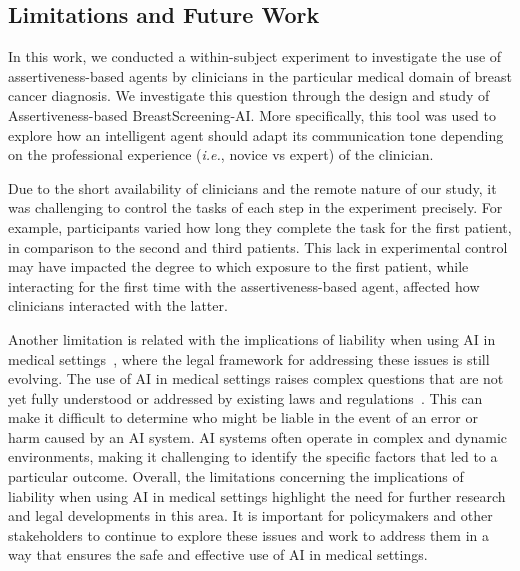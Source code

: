 

\subsection{Limitations and Future Work}
\label{sec:chap006007002}

In this work, we conducted a within-subject experiment to investigate the use of assertiveness-based agents by clinicians in the particular medical domain of breast cancer diagnosis.
We investigate this question through the design and study of Assertiveness-based BreastScreening-AI.
More specifically, this tool was used to explore how an intelligent agent should adapt its communication tone depending on the professional experience ({\it i.e.}, novice vs expert) of the clinician.

Due to the short availability of clinicians and the remote nature of our study, it was challenging to control the tasks of each step in the experiment precisely.
For example, participants varied how long they complete the task for the first patient, in comparison to the second and third patients.
This lack in experimental control may have impacted the degree to which exposure to the first patient, while interacting for the first time with the assertiveness-based agent, affected how clinicians interacted with the latter.

Another limitation is related with the implications of liability when using AI in medical settings~\cite{10.1145/3555157}, where the legal framework for addressing these issues is still evolving.
The use of AI in medical settings raises complex questions that are not yet fully understood or addressed by existing laws and regulations~\cite{10.1145/3411764.3445432}.
This can make it difficult to determine who might be liable in the event of an error or harm caused by an AI system.
AI systems often operate in complex and dynamic environments, making it challenging to identify the specific factors that led to a particular outcome.
Overall, the limitations concerning the implications of liability when using AI in medical settings highlight the need for further research and legal developments in this area.
It is important for policymakers and other stakeholders to continue to explore these issues and work to address them in a way that ensures the safe and effective use of AI in medical settings.

